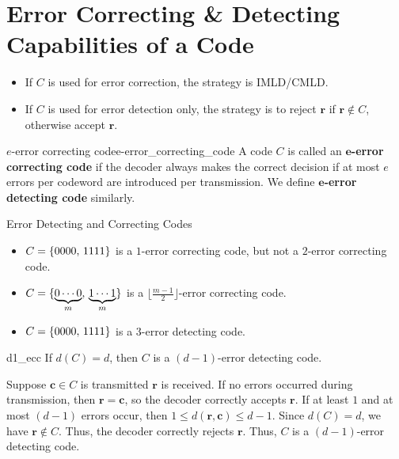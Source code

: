 
\section{Error Correcting \& Detecting Capabilities of a Code}
\begin{itemize}
    \item If $ C $ is used for error correction, the strategy is IMLD/CMLD\@.
    \item If $ C $ is used for error detection only, the strategy is
          to reject $ \symbf{r} $ if $ \symbf{r}\notin C $, otherwise accept $ \symbf{r} $.
\end{itemize}

\begin{Definition}{$ e $-error correcting code}{e-error_correcting_code}
    A code $ C $ is called an \textbf{$\symbf{e}$-error correcting code}
    if the decoder always makes the correct decision if
    at most $ e $ errors per codeword are introduced per transmission.
    We define \textbf{$\symbf{e}$-error detecting code} similarly.
\end{Definition}

\begin{Example}{Error Detecting and Correcting Codes}{}
    \begin{itemize}
        \item $ C=\{0000,\,1111\} $ is a $ 1 $-error correcting code, but not a
              $ 2 $-error correcting code.
        \item $ C=\{\underbrace{0\cdots 0}_{m},\,\underbrace{1\cdots 1}_{m}\} $
              is a $ \bigl\lfloor \frac{m-1}{2} \bigr\rfloor $-error correcting code.
        \item $ C=\{0000,\,1111\} $ is a $ 3 $-error detecting code.
    \end{itemize}
\end{Example}

\begin{Theorem}{}{d1_ecc}
    If $ d(C)=d $, then $ C $ is a $ (d-1) $-error detecting code.
\end{Theorem}

\begin{Proof}{}{}
    Suppose $ \symbf{c}\in C $ is transmitted $ \symbf{r} $ is received. If no
    errors occurred during transmission, then $ \symbf{r}=\symbf{c} $,
    so the decoder correctly accepts $ \symbf{r} $. If at least $ 1 $
    and at most $ (d-1) $ errors occur, then
    $ 1\leqslant d(\symbf{r},\symbf{c})\leqslant d-1 $. Since $ d(C)=d $,
    we have $ \symbf{r}\notin C $. Thus, the decoder correctly rejects
    $ \symbf{r} $. Thus, $ C $ is a $ (d-1) $-error detecting code.
\end{Proof}

